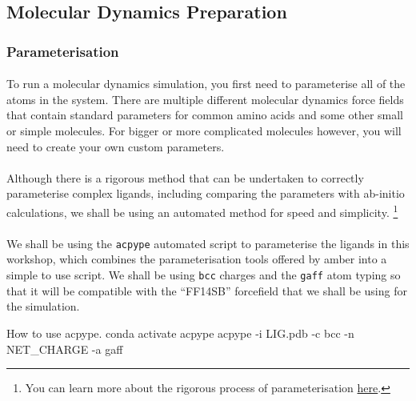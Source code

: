 \subsection{Molecular Dynamics Preparation}
\subsubsection{Parameterisation}
    \paragraph{}
        To run a molecular dynamics simulation, you first need to parameterise all of the atoms in the system. There are multiple different molecular dynamics force fields that contain standard parameters for common amino acids and some other small or simple molecules. For bigger or more complicated molecules however, you will need to create your own custom parameters. 

    \paragraph{}
        Although there is a rigorous method that can be undertaken to correctly parameterise complex ligands, including comparing the parameters with ab-initio calculations, we shall be using an automated method for speed and simplicity. \footnote{You can learn more about the rigorous process of parameterisation \href{http://ambermd.org/tutorials/basic/tutorial4b/}{here}.}

    \paragraph{}
        We shall be using the \texttt{acpype}\cite{} automated script to parameterise the ligands in this workshop, which combines the parameterisation tools offered by amber into a simple to use script. We shall be using \texttt{bcc} charges and the \texttt{gaff} atom typing so that it will be compatible with the \enquote{FF14SB} forcefield that we shall be using for the simulation.

    \begin{bashcmd}[label=listing:acpypeCMD]{How to use acpype.}
        conda activate acpype
        acpype -i LIG.pdb -c bcc -n NET_CHARGE -a gaff
    \end{bashcmd}